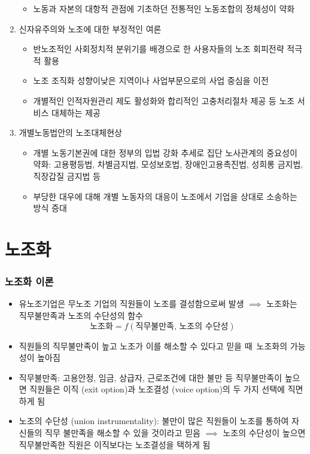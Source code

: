 \documentclass[aspectratio=169,xcolor=dvipsnames,handout]{beamer}
\begin{document}
\begin{frame}[allowframebreaks]
\begin{enumerate}[<+->]
\begin{itemize}
                \item 노동과 자본의 대항적 관점에 기초하던 전통적인 노동조합의 정체성이 약화
        \end{itemize}
        \item  신자유주의와 노조에 대한 부정적인 여론
        \begin{itemize}
                \item 반노조적인 사회정치적 분위기를 배경으로 한 사용자들의 노조 회피전략 적극적 활용
                \item 노조 조직화 성향이낮은 지역이나 사업부문으로의 사업 중심을 이전
                \item 개별적인 인적자원관리 제도 활성화와 합리적인 고충처리절차 제공 등 노조 서비스 대체하는 제공
        \end{itemize}
        \framebreak%
        \item  개별노동법안의 노조대체현상
        \begin{itemize}
                \item 개별 노동기본권에 대한 정부의 입법 강화 추세로 집단 노사관계의 중요성이 약화: 고용평등법, 차별금지법, 모성보호법, 장애인고용촉진법, 성희롱 금지법, 직장갑질 금지법 등
                \item 부당한 대우에 대해 개별 노동자의 대응이 노조에서 기업을 상대로 소송하는 방식 증대 
        \end{itemize}
    \end{enumerate}
\end{frame}

\section{노조화}
\begin{frame}[allowframebreaks]
    \frametitle{노조화 이론}
    \begin{itemize}[<+->]
        \item 유노조기업은 무노조 기업의 직원들이 노조를 결성함으로써 발생 $\implies$ 노조화는 직무불만족과 노조의 수단성의 함수
        \[
            \text{노조화} = f(\text{직무불만족, 노조의 수단성})
        \]
        \item 직원들의 직무불만족이 높고 노조가 이를 해소할 수 있다고 믿을 때 노조화의 가능성이 높아짐
        \framebreak%
        \item 직무불만족: 고용안정, 임금, 상급자, 근로조건에 대한 불만 등 직무불만족이 높으면 직원들은 이직 (exit option)과 노조결성 (voice option)의 두 가지 선택에 직면하게 됨
        \item 노조의 수단성 (union instrumentality): 불만이 많은 직원들이 노조를 통하여 자신들의 직무 불만족을 해소할 수 있을 것이라고 믿음 $\implies$  노조의 수단성이 높으면 직무불만족한 직원은 이직보다는 노조결성을 택하게 됨
    \end{itemize}
\end{frame}
\end{document}
